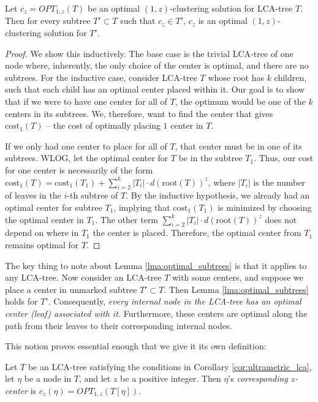 \begin{lemma}
    \label{lma:optimal_subtrees}
    Let $c_z = OPT_{1, z}(T)$ be an optimal $(1, z)$-clustering solution for LCA-tree $T$. Then for every subtree $T' \subset T$ such that $c_z \in T'$, $c_z$ is an
    optimal $(1, z)$-clustering solution for $T'$.
\end{lemma}
\begin{proof}

    We show this inductively. The base case is the trivial LCA-tree of one node where, inherently, the only choice of the center is optimal, and there are no
    subtrees. For the inductive case, consider LCA-tree $T$ whose root has $k$ children, such that each child has an optimal center placed within it. Our goal
    is to show that if we were to have one center for all of $T$, the optimum would be one of the $k$ centers in its subtrees. We, therefore, want to find the
    center that gives $\text{cost}_1(T)$ -- the cost of optimally placing $1$ center in $T$.

    If we only had one center to place for all of $T$, that center must be in one of its subtrees. WLOG, let the optimal center for $T$ be in the subtree
    $T_1$. Thus, our cost for one center is necessarily of the form $\text{cost}_1(T) = \text{cost}_1(T_1) + \sum_{i=2}^k |T_i| \cdot d(\text{root}(T))^z$,
    where $|T_i|$ is the number of leaves in the $i$-th subtree of $T$. By the inductive hypothesis, we already had an optimal center for subtree $T_1$,
    implying that $\text{cost}_1(T_1)$ is minimized by choosing the optimal center in $T_1$. The other term $\sum_{i=2}^k |T_i| \cdot d(\text{root}(T))^z$ does
    not depend on where in $T_1$ the center is placed. Therefore, the optimal center from $T_1$ remains optimal for $T$.

\end{proof}

The key thing to note about Lemma \ref{lma:optimal_subtrees} is that it applies to any LCA-tree. Now consider an LCA-tree $T$ with some centers, and suppose we place a center in unmarked subtree $T' \subset T$. Then Lemma \ref{lma:optimal_subtrees} holds for $T'$. Consequently, \emph{every internal node in the LCA-tree has an optimal center (leaf) associated with it.} Furthermore, these centers are optimal along the path from their leaves to their corresponding internal nodes.

This notion proves essential enough that we give it its own definition:
\begin{definition}
    Let $T$ be an LCA-tree satisfying the conditions in Corollary \ref{cor:ultrametric_lca}, let $\eta$ be a node in $T$, and let $z$ be a positive integer. Then $\eta$'s
    \emph{corresponding $z$-center} is $c_z(\eta) = OPT_{1, z}(T[\eta])$.
\end{definition}

